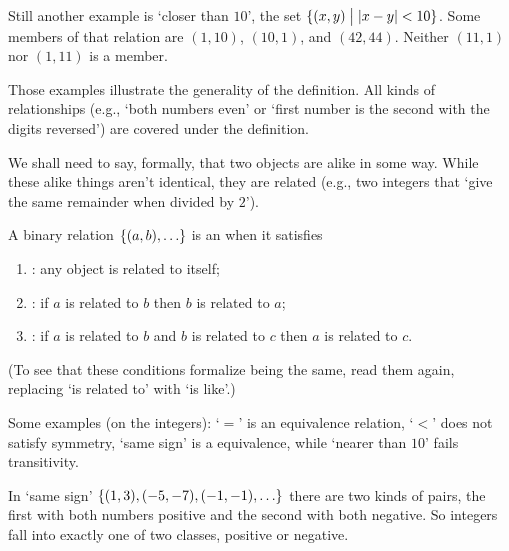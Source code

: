 Still another example is `closer than \( 10 \)', the set
\( \mbox{$\{(x,y)\bigm| |x-y|<10 \}$} \).
Some members of that relation are \( (1,10) \), \( (10,1) \),
and \( (42,44) \).
Neither \( (11,1) \) nor \( (1,11) \) is a member.

Those examples illustrate the generality of the definition.
All kinds of relationships (e.g., `both numbers
even' or `first number is the second with the digits reversed')
are covered under the definition.




We shall need to say, formally, that two objects are alike in some way.
While these alike things aren't identical, they are related
(e.g., two integers that `give the same remainder when divided by \( 2 \)').

A binary relation \( \mbox{$\{(a,b),\ldots \}$} \)
is an 
when it satisfies
\begin{enumerate}
  \item {}: 
     any object is related to itself;
  \item {}: 
     if \( a \) is related to \( b \) then
     \( b \) is related to \( a \);
 \item {}:
     if \( a \) is related to \( b \) and \( b \) is
     related to \( c \) then \( a \) is related to \( c \).
\end{enumerate}
(To see that these conditions formalize being the same, read them again,
replacing `is related to' with `is like'.)

Some examples (on the integers): `\( = \)' is an equivalence relation,
`\( < \)' does not satisfy symmetry,
`same sign' is a equivalence, while `nearer than \( 10 \)' fails transitivity.






In `same sign' \( \mbox{$\{ (1,3),(-5,-7),(-1,-1),\ldots\}$} \)
there are two kinds of pairs, the first with both numbers positive
and the second with both negative.
So integers fall into exactly one of two classes, positive or negative.

